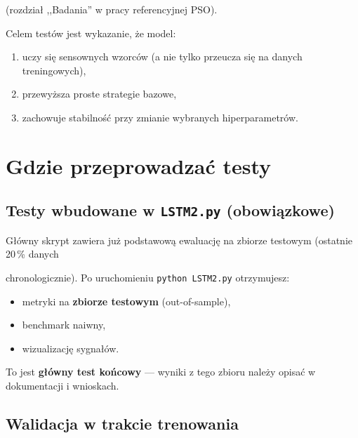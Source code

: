\documentclass[12pt,a4paper]{report}
\begin{document}
(rozdział ,,Badania'' w pracy referencyjnej PSO).

Celem testów jest wykazanie, że model:

\begin{enumerate}

    \item uczy się sensownych wzorców (a nie tylko przeucza się na danych treningowych),

    \item przewyższa proste strategie bazowe,

    \item zachowuje stabilność przy zmianie wybranych hiperparametrów.

\end{enumerate}



\section{Gdzie przeprowadzać testy}



\subsection{Testy wbudowane w \texttt{LSTM2.py} (obowiązkowe)}



Główny skrypt zawiera już podstawową ewaluację na zbiorze testowym (ostatnie 20\,\% danych

chronologicznie). Po uruchomieniu \texttt{python LSTM2.py} otrzymujesz:

\begin{itemize}

    \item metryki na \textbf{zbiorze testowym} (out-of-sample),

    \item benchmark naiwny,

    \item wizualizację sygnałów.

\end{itemize}

To jest \textbf{główny test końcowy} --- wyniki z tego zbioru należy opisać w dokumentacji i wnioskach.



\subsection{Walidacja w trakcie trenowania}
\end{document}
